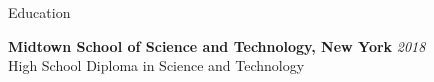\documentclass{resume}
\begin{document}

\begin{rSection}{Education}

{\bf Midtown School of Science and Technology, New York} \hfill {\em 2018} 
\\ High School Diploma in Science and Technology


\end{rSection}
\end{document}
